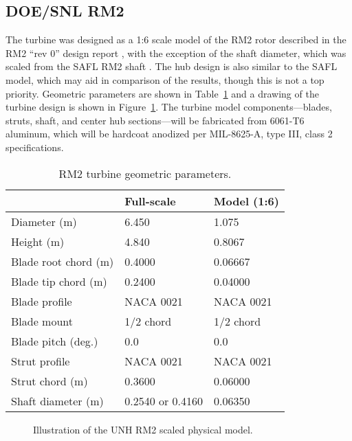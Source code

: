 \subsection{DOE/SNL RM2}

The turbine was designed as a 1:6 scale model of the RM2 rotor described in the
RM2 ``rev 0'' design report \cite{Barone2011}, with the exception of the shaft
diameter, which was scaled from the SAFL RM2 shaft \cite{Hill2014}. The hub
design is also similar to the SAFL model, which may aid in comparison of the
results, though this is not a top priority. Geometric parameters are shown in
Table~\ref{tab:turb-geom} and a drawing of the turbine design is shown in
Figure~\ref{fig:RM2-drawing}. The turbine model components---blades, struts,
shaft, and center hub sections---will be fabricated from 6061-T6 aluminum, which
will be hardcoat anodized per MIL-8625-A, type III, class 2 specifications.

\begin{table}[ht]
    \centering
    \begin{tabular}{l|l|l}
        & Full-scale & Model (1:6) \\
        \hline 
        Diameter (m)   & 6.450 & 1.075 \\ 
        Height (m)     & 4.840 & 0.8067 \\ 
        Blade root chord (m) & 0.4000 & 0.06667 \\ 
        Blade tip chord (m)  & 0.2400 & 0.04000 \\ 
        Blade profile & NACA 0021 & NACA 0021 \\ 
        Blade mount & 1/2 chord & 1/2 chord \\ 
        Blade pitch (deg.) & 0.0 & 0.0 \\ 
        Strut profile & NACA 0021 & NACA 0021 \\ 
        Strut chord (m) & 0.3600 & 0.06000 \\ 
        Shaft diameter (m) & 0.2540 \cite{Beam2011} or 0.4160 \cite{Hill2014} & 0.06350\\ 
    \end{tabular}
    \caption{RM2 turbine geometric parameters.}
    \label{tab:turb-geom}
\end{table}

\begin{figure}[ht]
    \centering
    \caption{Illustration of the UNH RM2 scaled physical model.}
    \label{fig:RM2-drawing}
\end{figure}